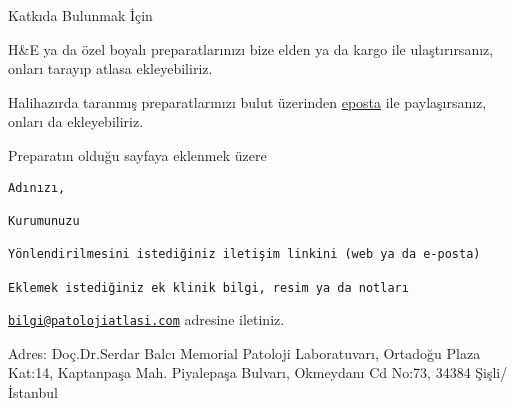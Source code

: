 \documentclass[
  letterpaper,
  DIV=11,
  numbers=noendperiod]{scrreprt}
\begin{document}
Katkıda Bulunmak İçin

H\&E ya da özel boyalı preparatlarınızı bize elden ya da kargo ile
ulaştırırsanız, onları tarayıp atlasa ekleyebiliriz.

Halihazırda taranmış preparatlarınızı bulut üzerinden
\href{mailto:bilgi@patolojiatlasi.com}{eposta} ile paylaşırsanız, onları
da ekleyebiliriz.

Preparatın olduğu sayfaya eklenmek üzere

\begin{verbatim}
Adınızı,

Kurumunuzu

Yönlendirilmesini istediğiniz iletişim linkini (web ya da e-posta)

Eklemek istediğiniz ek klinik bilgi, resim ya da notları
\end{verbatim}

\href{mailto:bilgi@patolojiatlasi.com}{\nolinkurl{bilgi@patolojiatlasi.com}}
adresine iletiniz.

Adres: Doç.Dr.Serdar Balcı Memorial Patoloji Laboratuvarı, Ortadoğu
Plaza Kat:14, Kaptanpaşa Mah. Piyalepaşa Bulvarı, Okmeydanı Cd No:73,
34384 Şişli/İstanbul
\end{document}
